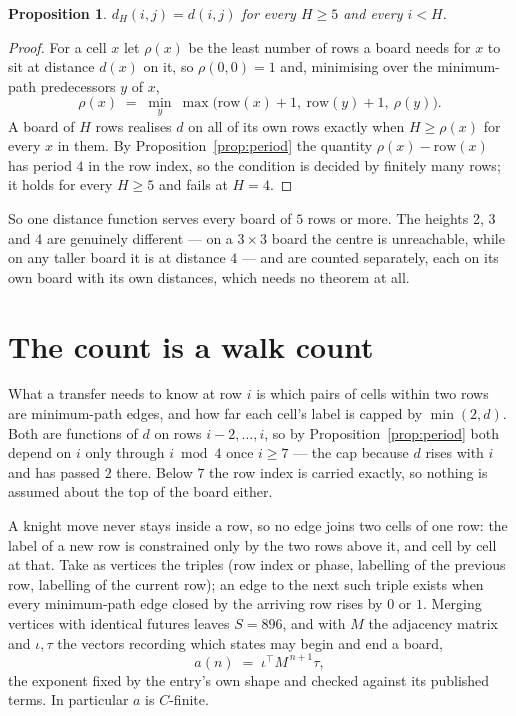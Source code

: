 \documentclass[11pt,a4paper]{article}
\theoremstyle{plain}
\newtheorem{proposition}[theorem]{Proposition}
\theoremstyle{definition}
\begin{document}
\begin{proposition}\label{prop:height}
$d_H(i,j)=d(i,j)$ for every $H\ge5$ and every $i<H$.
\end{proposition}

\begin{proof}
For a cell $x$ let $\rho(x)$ be the least number of rows a board needs for $x$ to sit at distance $d(x)$ on it, so $\rho(0,0)=1$ and, minimising over the minimum-path predecessors $y$ of $x$,
\[ \rho(x)\;=\;\min_y\ \max\bigl(\mathrm{row}(x)+1,\ \mathrm{row}(y)+1,\ \rho(y)\bigr). \]
A board of $H$ rows realises $d$ on all of its own rows exactly when $H\ge\rho(x)$ for every $x$ in them. By Proposition~\ref{prop:period} the quantity $\rho(x)-\mathrm{row}(x)$ has period $4$ in the row index, so the condition is decided by finitely many rows; it holds for every $H\ge5$ and fails at $H=4$.
\end{proof}

So one distance function serves every board of $5$ rows or more. The heights 2, 3 and 4 are genuinely different --- on a $3\times3$ board the centre is unreachable, while on any taller board it is at distance $4$ --- and are counted separately, each on its own board with its own distances, which needs no theorem at all.

\section{The count is a walk count}

What a transfer needs to know at row $i$ is which pairs of cells within two rows are minimum-path edges, and how far each cell's label is capped by $\min(2,d)$. Both are functions of $d$ on rows $i-2,\dots,i$, so by Proposition~\ref{prop:period} both depend on $i$ only through $i\bmod 4$ once $i\ge7$ --- the cap because $d$ rises with $i$ and has passed $2$ there. Below $7$ the row index is carried exactly, so nothing is assumed about the top of the board either.

A knight move never stays inside a row, so no edge joins two cells of one row: the label of a new row is constrained only by the two rows above it, and cell by cell at that. Take as vertices the triples (row index or phase, labelling of the previous row, labelling of the current row); an edge to the next such triple exists when every minimum-path edge closed by the arriving row rises by $0$ or $1$. Merging vertices with identical futures leaves $S=896$, and with $M$ the adjacency matrix and $\iota,\tau$ the vectors recording which states may begin and end a board,
\[
a(n)\;=\;\iota^{\!\top}M^{\,n+1}\tau ,
\]
the exponent fixed by the entry's own shape and checked against its published terms. In
particular $a$ is $C$-finite.
\end{document}
